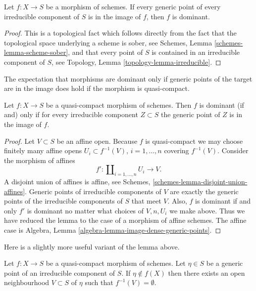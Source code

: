 \begin{lemma}
\label{lemma-generic-points-in-image-dominant}
Let $f : X \to S$ be a morphism of schemes.
If every generic point of every irreducible component of $S$
is in the image of $f$, then $f$ is dominant.
\end{lemma}

\begin{proof}
This is a topological fact which follows directly from the fact that
the topological space underlying a scheme is sober, see
Schemes, Lemma \ref{schemes-lemma-scheme-sober}, and that
every point of $S$ is contained in an irreducible component of
$S$, see Topology, Lemma \ref{topology-lemma-irreducible}.
\end{proof}

\noindent
The expectation that morphisms are dominant only if generic points of the
target are in the image does hold if the morphism is quasi-compact.

\begin{lemma}
\label{lemma-quasi-compact-dominant}
Let $f : X \to S$ be a quasi-compact morphism of schemes.
Then $f$ is dominant (if and) only if for every irreducible
component $Z \subset S$ the generic point of $Z$ is in the
image of $f$.
\end{lemma}

\begin{proof}
Let $V \subset S$ be an affine open.
Because $f$ is quasi-compact we may choose finitely many affine
opens $U_i \subset f^{-1}(V)$, $i = 1, \ldots, n$ covering
$f^{-1}(V)$. Consider the morphism of affines
$$
f' :
\coprod\nolimits_{i = 1, \ldots, n} U_i
\longrightarrow
V.
$$
A disjoint union of affines is affine, see
Schemes, \ref{schemes-lemma-disjoint-union-affines}.
Generic points of irreducible components of $V$
are exactly the generic points of the irreducible components of
$S$ that meet $V$. Also, $f$ is dominant if and only $f'$ is dominant
no matter what choices of $V, n, U_i$ we make above. Thus we
have reduced the lemma to the case of a morphism of affine schemes.
The affine case is
Algebra, Lemma \ref{algebra-lemma-image-dense-generic-points}.
\end{proof}

\noindent
Here is a slightly more useful variant of the lemma above.

\begin{lemma}
\label{lemma-quasi-compact-generic-point-not-in-image}
Let $f : X \to S$ be a quasi-compact morphism of schemes.
Let $\eta \in S$ be a generic point of an irreducible
component of $S$. If $\eta \not \in f(X)$ then there
exists an open neighbourhood $V \subset S$ of $\eta$
such that $f^{-1}(V) = \emptyset$.
\end{lemma}

